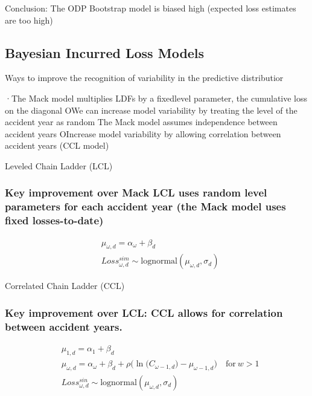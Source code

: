\documentclass[
]{article}
\begin{document}
Conclusion: The ODP Bootstrap model is biased high (expected loss
estimates are too high)

\subsection{Bayesian Incurred Loss
Models}\label{bayesian-incurred-loss-models}

Ways to improve the recognition of variability in the predictive
distributior

·The Mack model multiplies LDFs by a fixedlevel parameter, the
cumulative loss on the diagonal OWe can increase model variability by
treating the level of the accident year as random The Mack model assumes
independence between accident years OIncrease model variability by
allowing correlation between accident years (CCL model)

Leveled Chain Ladder (LCL)

\subsubsection{Key improvement over Mack LCL uses random level
parameters for each accident year (the Mack model uses fixed
losses-to-date)}\label{key-improvement-over-mack-lcl-uses-random-level-parameters-for-each-accident-year-the-mack-model-uses-fixed-losses-to-date}

\[\begin{aligned}&\mu_{\omega,d}=\alpha_{\omega}+\beta_{d}\\&Loss_{\omega,d}^{sim}\sim\mathrm{lognormal}\left(\mu_{\omega,d},\sigma_{d}\right)\end{aligned}\]

Correlated Chain Ladder (CCL)

\subsubsection{Key improvement over LCL: CCL allows for correlation
between accident
years.}\label{key-improvement-over-lcl-ccl-allows-for-correlation-between-accident-years.}

\[
\begin{aligned}
&\mu_{1,d}=\alpha_{1}+\beta_{d} \\
&\mu_{\omega,d}=\alpha_{\omega}+\beta_{d}+\rho\Big(\ln\Big(C_{\omega-1,d}\Big)-\mu_{\omega-1,d}\Big)\quad\mathrm{for}\:w>1 \\
&Loss_{\omega,d}^{sin}\sim\mathrm{lognormal}(\mu_{\omega,d},\sigma_{d})
\end{aligned}
\]
\end{document}

